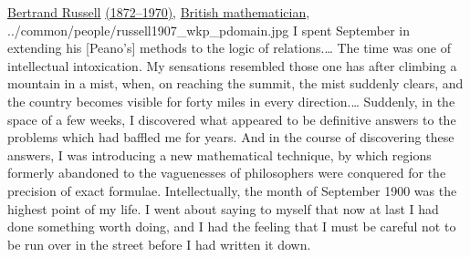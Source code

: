 \qboxnpq
  { \href{http://en.wikipedia.org/wiki/Bertrand_Russell}{Bertrand Russell}
    \href{http://www-history.mcs.st-andrews.ac.uk/Timelines/TimelineF.html}{(1872--1970)},
    \href{http://www-history.mcs.st-andrews.ac.uk/BirthplaceMaps/Places/UK.html}{British mathematician},
    \footnotemark
  }
  {../common/people/russell1907_wkp_pdomain.jpg} %
  {I spent September in extending his [Peano's] methods to the 
  logic of relations.\ldots
  The time was one of intellectual intoxication. 
  My sensations resembled those one has after climbing a mountain in a mist, 
  when, on reaching the summit, 
  the mist suddenly clears, and the country becomes visible 
  for forty miles in every direction.\ldots
  Suddenly, in the space of a few weeks, 
  I discovered what appeared to be definitive answers to the problems 
  which had baffled me for years. 
  And in the course of discovering these answers, I was introducing a 
  new mathematical technique, by which regions formerly abandoned 
  to the vaguenesses of philosophers were conquered for 
  the precision of exact formulae. Intellectually, the month of 
  September 1900 was the highest point of my life. I went about 
  saying to myself that now at last I had done something worth 
  doing, and I had the feeling that I must be careful not to be run 
  over in the street before I had written it down.}

